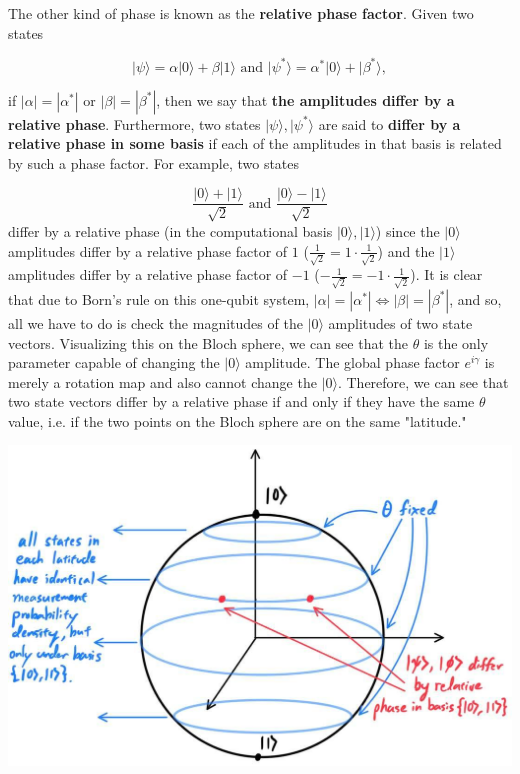 \documentclass{article}
\theoremstyle{definition}
\begin{document}
        The other kind of phase is known as the \textbf{relative phase factor}. Given two states

          \[|\psi \rangle = \alpha |0\rangle + \beta |1\rangle \text{ and } |\psi^* \rangle = \alpha^* |0 \rangle + | \beta^* \rangle,\]

        if $|\alpha| = |\alpha^*|$ or $|\beta| = |\beta^*|$, then we say that \textbf{the amplitudes differ by a relative phase}. Furthermore, two states $|\psi \rangle, |\psi^* \rangle$ are said to \textbf{differ by a relative phase in some basis} if each of the amplitudes in that basis is related by such a phase factor. For example, two states 

        \[\frac{|0\rangle + |1\rangle}{\sqrt{2}} \text{ and } \frac{|0\rangle - |1\rangle}{\sqrt{2}}\]
        differ by a relative phase (in the computational basis $|0\rangle, |1\rangle$) since the $|0\rangle$ amplitudes differ by a relative phase factor of $1$ ($ \frac{1}{\sqrt{2}} = 1 \cdot \frac{1}{\sqrt{2}}$) and the $|1\rangle$ amplitudes differ by a relative phase factor of $-1$ ($-\frac{1}{\sqrt{2}} = -1 \cdot \frac{1}{\sqrt{2}}$). It is clear that due to Born's rule on this one-qubit system, $|\alpha| = |\alpha^*| \iff |\beta| = |\beta^*|$, and so, all we have to do is check the magnitudes of the $|0\rangle$ amplitudes of two state vectors. Visualizing this on the Bloch sphere, we can see that the $\theta$ is the only parameter capable of changing the $|0\rangle$ amplitude. The global phase factor $e^{i\gamma}$ is merely a rotation map and also cannot change the $|0\rangle$. Therefore, we can see that two state vectors differ by a relative phase if and only if they have the same $\theta$ value, i.e. if the two points on the Bloch sphere are on the same "latitude."

        \begin{center} 
          \includegraphics[scale=0.3]{img/Bloch_Sphere_latitude.jpg}
        \end{center}
\end{document}
